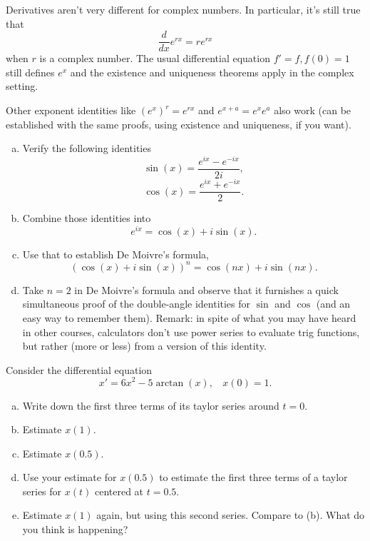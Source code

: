 \documentclass{article}
\begin{document}
\begin{problem}
    Derivatives aren't very different for complex numbers. In particular, it's still true that
    \[\frac{d}{dx} e^{rx} = re^{rx}\]
    when \(r\) is a complex number. The usual differential equation \(f'=f, f(0)=1\) still defines \(e^x\) and the existence and uniqueness theorems apply in the complex setting. 
    
    \hspace{2em}Other exponent identities like \((e^x)^r = e^{rx}\) and \(e^{x+a} = e^xe^a\) also work (can be established with the same proofs, using existence and uniqueness, if you want).
    \begin{enumerate}[a)]
        \item Verify the following identities
            \[\sin(x) = \frac{e^{ix} - e^{-ix}}{2i},\]
            \[\cos(x) = \frac{e^{ix} + e^{-ix}}{2}.\]
        \item Combine those identities into
            \[e^{ix} = \cos(x) + i\sin(x).\]
        \item Use that to establish De Moivre's formula,
            \[(\cos(x) + i\sin(x))^n = \cos(nx) + i\sin(nx).\]
        \item Take \(n=2\) in De Moivre's formula and observe that it furnishes a quick simultaneous proof of the double-angle identities for \(\sin\) and \(\cos\)  (and an easy way to remember them). Remark: in spite of what you may have heard in other courses, calculators don't use power series to evaluate trig functions, but rather (more or less) from a version of this identity.
    \end{enumerate}
\end{problem}


\begin{problem}
    Consider the differential equation
    \[x' = 6x^2 - 5\arctan(x),\ \ \ \ x(0) = 1.\]
    
    \begin{enumerate}[a)]
        \item Write down the first three terms of its taylor series around \(t=0\).
        \item Estimate \(x(1)\).
        \item Estimate \(x(0.5)\).
        \item Use your estimate for \(x(0.5)\) to estimate the first three terms of a taylor series for \(x(t)\) centered at \(t=0.5\).
        \item Estimate \(x(1)\) again, but using this second series. Compare to (b). What do you think is happening?
    \end{enumerate}
\end{problem}
\end{document}

